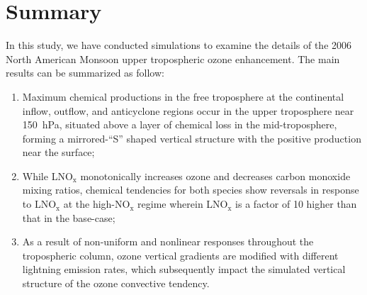 \section{Summary}\label{sect:summary}

In this study, we have conducted simulations to examine the details of the
2006 North American Monsoon upper tropospheric ozone enhancement.
The main results can be summarized as follow:
\begin{enumerate}
\item Maximum chemical productions in the free troposphere at the continental
inflow, outflow, and anticyclone regions occur in the upper troposphere near
150~hPa, situated above a layer of chemical loss in the mid-troposphere, forming
a mirrored-``S'' shaped vertical structure with the positive production near the surface;
\item While LNO$_\mathrm{x}$ monotonically increases ozone and decreases
carbon monoxide mixing ratios, chemical tendencies for both species show reversals in
response to LNO$_\mathrm{x}$ at the high-NO$_\mathrm{x}$ regime wherein
LNO$_{\mathrm{x}}$ is a factor of 10 higher than that in the base-case;
\item As a result of non-uniform and nonlinear responses throughout the tropospheric column,
ozone vertical gradients are modified with different lightning emission rates, which subsequently impact the
simulated vertical structure of the ozone convective tendency.

\end{enumerate}

